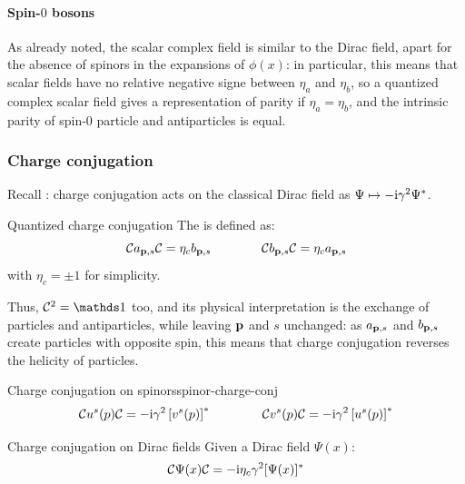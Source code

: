 \paragraph{Spin-$ 0 $ bosons}

As already noted, the scalar complex field is similar to the Dirac field, apart for the absence of spinors in the expansions of $ \phi(x) $: in particular, this means that scalar fields have no relative negative signe between $ \eta_a $ and $ \eta_b $, so a quantized complex scalar field gives a representation of parity if $ \eta_a = \eta_b $, and the intrinsic parity of spin-$ 0 $ particle and antiparticles is equal.

\subsubsection{Charge conjugation}

Recall : charge conjugation acts on the classical Dirac field as $ \Psi \mapsto -\mathrm{i} \gamma^2 \Psi^* $.

\begin{definition}{Quantized charge conjugation}{}
  The  is defined as:
  \begin{equation}
    \mathcal{C} a_{\mathbf{p},s} \mathcal{C} = \eta_c b_{\mathbf{p},s}
    \qquad \qquad
    \mathcal{C} b_{\mathbf{p},s} \mathcal{C} = \eta_c a_{\mathbf{p},s}
    \label{eq:charge-conj-op}
  \end{equation}
  with $ \eta_c = \pm 1 $ for simplicity.
\end{definition}

Thus, $ \chargec^2 = \id $ too, and its physical interpretation is the exchange of particles and antiparticles, while leaving $ \mathbf{p} $ and $ s $ unchanged: as $ a_{\mathbf{p},s} $ and $ b_{\mathbf{p},s} $ create particles with opposite spin, this means that charge conjugation reverses the helicity of particles.

\begin{lemma}[before upper = {\tcbtitle}]{Charge conjugation on spinors}{spinor-charge-conj}
  \begin{equation}
    \mathcal{C} u^s(p) \mathcal{C} = -\mathrm{i} \gamma^2 \left[ v^s(p) \right]^*
    \qquad \qquad
    \mathcal{C} v^s(p) \mathcal{C} = -\mathrm{i} \gamma^2 \left[ u^s(p) \right]^*
    \label{eq:charge-conj-spin}
  \end{equation}
\end{lemma}

\begin{proposition}{Charge conjugation on Dirac fields}{}
  Given a Dirac field $ \Psi(x) $:
  \begin{equation}
    \mathcal{C} \Psi(x) \mathcal{C} = -\mathrm{i} \eta_c \gamma^2 [\Psi(x)]^*
  \end{equation}
\end{proposition}


